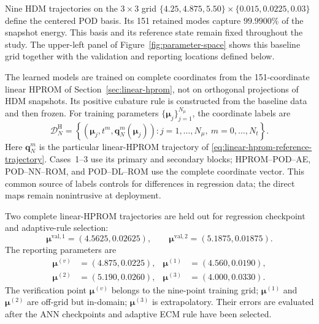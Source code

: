 \documentclass[11pt]{article}
\newcommand{\q}{\mathbf q}
\newcommand{\mub}{\bm\mu}
\begin{document}
Nine HDM trajectories on the $3\times3$ grid
$\{4.25,4.875,5.50\}\times\{0.015,0.0225,0.03\}$ define the centered
POD basis.  Its 151 retained modes capture $99.9900\%$ of the snapshot
energy.  This basis and its reference state remain fixed throughout the study.
The upper-left panel of Figure~\ref{fig:parameter-space} shows this
baseline grid together with the validation and reporting locations defined
below.

The learned models are trained on complete coordinates from the
151-coordinate linear HPROM of Section~\ref{sec:linear-hprom}, not on
orthogonal projections of HDM snapshots.  Its positive cubature rule is
constructed from the baseline data and then frozen.  For training parameters
$\{\mub_j\}_{j=1}^{N_\mu}$, the coordinate labels are
\begin{equation}
\mathcal D_N^{\mathrm H}=
\left\{(\mub_j,t^m,\q_N^m(\mub_j)):
 j=1,\ldots,N_\mu,\ m=0,\ldots,N_t\right\}.
\label{eq:hprom-coordinate-training-data}
\end{equation}
Here $\q_N^m$ is the particular linear-HPROM trajectory of
\eqref{eq:linear-hprom-reference-trajectory}.  Cases~1--3 use its primary
and secondary blocks; HPROM--POD--AE, POD--NN--ROM, and POD--DL--ROM use
the complete coordinate vector.  This common source of labels controls
for differences in regression data; the direct maps remain nonintrusive
at deployment.

Two complete linear-HPROM trajectories are held out for regression
checkpoint and adaptive-rule selection:
\begin{equation}
\mub^{\mathrm{val},1}=(4.5625,0.02625),\qquad
\mub^{\mathrm{val},2}=(5.1875,0.01875).
\label{eq:validation-points}
\end{equation}
The reporting parameters are
\begin{equation}
\begin{aligned}
\mub^{(v)}&=(4.875,0.0225),&\mub^{(1)}&=(4.560,0.0190),\\
\mub^{(2)}&=(5.190,0.0260),&\mub^{(3)}&=(4.000,0.0330).
\end{aligned}
\label{eq:evaluation-points}
\end{equation}
The verification point $\mub^{(v)}$ belongs to the nine-point training grid;
$\mub^{(1)}$ and $\mub^{(2)}$ are off-grid but in-domain;
$\mub^{(3)}$ is extrapolatory.  Their errors are evaluated after the ANN
checkpoints and adaptive ECM rule have been selected.
\end{document}
